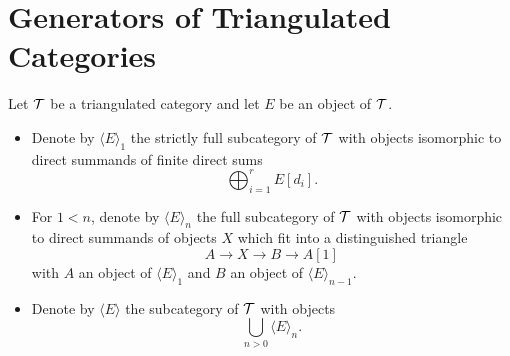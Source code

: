 \documentclass[10pt]{amsart}
\begin{document}
\section{Generators of Triangulated Categories}

\begin{defn}
  Let $\mathcal{T}$ be a triangulated category and let $E$ be an object of $\mathcal{T}$.
  \begin{itemize}
    \item
      Denote by $\langle E \rangle_1$ the strictly full subcategory of $\mathcal{T}$ with objects isomorphic to direct summands of finite direct sums
      $$\bigoplus_{i = 1}^r E[d_i].$$
    \item
      For $1 < n$, denote by $\langle E \rangle_n$ the full subcategory of $\mathcal{T}$ with objects isomorphic to direct summands of objects $X$ which fit into a distinguished triangle
      $$A \rightarrow X \rightarrow B \rightarrow A[1]$$
      with $A$ an object of $\langle E \rangle_1$ and $B$ an object of $\langle E \rangle_{n-1}$.
    \item
      Denote by $\langle E \rangle$ the subcategory of $\mathcal{T}$ with objects
      $$\bigcup_{n>0} \langle E \rangle_n.$$
  \end{itemize}
\end{defn}
\end{document}
